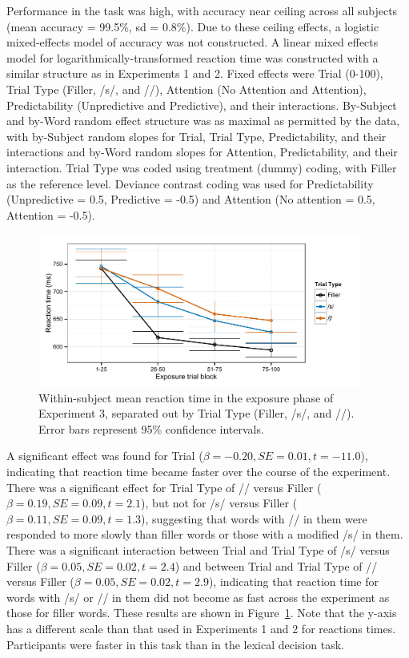 Performance in the task was high, with accuracy near ceiling across all subjects (mean accuracy = 99.5\%, sd = 0.8\%).
Due to these ceiling effects, a logistic mixed-effects model of accuracy was not constructed.  
A linear mixed effects model for logarithmically-transformed reaction time was constructed with a similar structure as in Experiments 1 and 2.
Fixed effects were Trial (0-100), Trial Type (Filler, /s/, and /\textesh/), Attention (No Attention and Attention), Predictability (Unpredictive and Predictive), and their interactions.  
By-Subject and by-Word random effect structure was as maximal as permitted by the data, with by-Subject random slopes for Trial, Trial Type, Predictability, and their interactions and by-Word random slopes for Attention, Predictability, and their interaction. 
Trial Type was coded using treatment (dummy) coding, with Filler as the reference level. 
Deviance contrast coding was used for Predictability (Unpredictive = 0.5, Predictive = -0.5) and Attention (No attention = 0.5, Attention = -0.5).

\begin{figure}[!ht]
\centering
\caption{Within-subject mean reaction time in the exposure phase of Experiment 3, separated out by Trial Type (Filler, /s/, and /\textesh/). Error bars represent 95\% confidence intervals.}
\label{fig:exp3exposert}
\begin{center}
\includegraphics[width=0.95\textwidth]{graphs/exp3_exprt}
\end{center}
\end{figure}

A significant effect was found for Trial ($\beta = -0.20, SE = 0.01, t = -11.0$), indicating that reaction time became faster over the course of the experiment.
There was a significant effect for Trial Type of /\textesh/ versus Filler ($\beta = 0.19, SE = 0.09, t = 2.1$), but not for /s/ versus Filler ($\beta = 0.11, SE = 0.09, t = 1.3$), suggesting that words with /\textesh/ in them were responded to more slowly than filler words or those with a modified /s/ in them.
There was a significant interaction between Trial and Trial Type of  /s/ versus Filler ($\beta = 0.05, SE = 0.02, t = 2.4$) and between Trial and Trial Type of /\textesh/ versus Filler ($\beta = 0.05, SE = 0.02, t = 2.9$), indicating that reaction time for words with /s/ or /\textesh/ in them did not become as fast across the experiment as those for filler words.
These results are shown in Figure~\ref{fig:exp3exposert}.
Note that the y-axis has a different scale than that used in Experiments 1 and 2 for reactions times.
Participants were faster in this task than in the lexical decision task.


